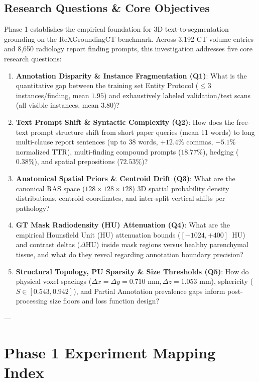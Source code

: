 \documentclass[11pt,a4paper]{article}
\begin{document}
\subsection{Research Questions \& Core Objectives}
Phase 1 establishes the empirical foundation for 3D text-to-segmentation grounding on the ReXGroundingCT benchmark. Across 3,192 CT volume entries and 8,650 radiology report finding prompts, this investigation addresses five core research questions:
\begin{enumerate}
    \item \textbf{Annotation Disparity \& Instance Fragmentation (Q1)}: What is the quantitative gap between the training set Entity Protocol ($\le 3$ instances/finding, mean $1.95$) and exhaustively labeled validation/test scans (all visible instances, mean $3.80$)?
    \item \textbf{Text Prompt Shift \& Syntactic Complexity (Q2)}: How does the free-text prompt structure shift from short paper queries (mean 11 words) to long multi-clause report sentences (up to 38 words, $+12.4\%$ commas, $-5.1\%$ normalized TTR), multi-finding compound prompts ($18.77\%$), hedging ($0.38\%$), and spatial prepositions ($72.53\%$)?
    \item \textbf{Anatomical Spatial Priors \& Centroid Drift (Q3)}: What are the canonical RAS space ($128 \times 128 \times 128$) 3D spatial probability density distributions, centroid coordinates, and inter-split vertical shifts per pathology?
    \item \textbf{GT Mask Radiodensity (HU) Attenuation (Q4)}: What are the empirical Hounsfield Unit (HU) attenuation bounds ($\left[-1024, +400\right]$~HU) and contrast deltas ($\Delta\text{HU}$) inside mask regions versus healthy parenchymal tissue, and what do they reveal regarding annotation boundary precision?
    \item \textbf{Structural Topology, PU Sparsity \& Size Thresholds (Q5)}: How do physical voxel spacings ($\Delta x=\Delta y=0.710\text{ mm}, \Delta z=1.053\text{ mm}$), sphericity ($S \in \left[0.543, 0.942\right]$), and Partial Annotation prevalence gaps inform post-processing size floors and loss function design?
\end{enumerate}

---

\section{Phase 1 Experiment Mapping Index}
\end{document}
